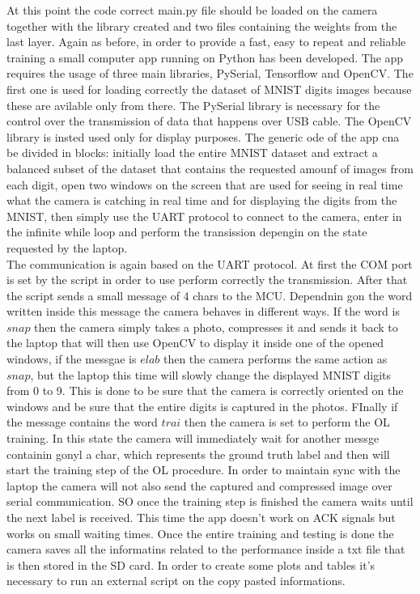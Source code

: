 \documentclass[12pt]{report}
\begin{document}
At this point the code correct main.py file should be loaded on the camera together with the library created and two files containing the weights from the last layer. Again as before, in order to provide a fast, easy to repeat and reliable training a small computer app running on Python has been developed. The app requires the usage of three main libraries, PySerial, Tensorflow and OpenCV. The first one is used for loading correctly the dataset of MNIST digits images because these are avilable only from there. The PySerial library is necessary for the control over the transmission of data that happens over USB cable. The OpenCV library is insted used only for display purposes. The generic ode of the app cna be divided in blocks: initially load the entire MNIST dataset and extract a balanced subset of the dataset that contains the requested amounf of images from each digit, open two windows on the screen that are used for seeing in real time what the camera is catching in real time and for displaying the digits from the MNIST, then simply use the UART protocol to connect to the camera, enter in the infinite while loop and perform the transission depengin on the state requested by the laptop. \\
The communication is again based on the UART protocol. At first the COM port is set by the script in order to use perform correctly the transmission. After that the script sends a small message of 4 chars to the MCU. Dependnin gon the word written inside this message the camera behaves in different ways. If the word is $snap$ then the camera simply takes a photo, compresses it and sends it back to the laptop that will then use OpenCV to display it inside one of the opened windows, if the messgae is $elab$ then the camera performs the same action as $snap$, but the laptop this time will slowly change the displayed MNIST digits from 0 to 9. This is done to be sure that the camera is correctly oriented on the windows and be sure that the entire digits is captured in the photos. FInally if the message contains the word $trai$ then the camera is set to perform the OL training. In this state the camera will immediately wait for another messge containin gonyl a char, which represents the ground truth label and then will start the training step of the OL procedure. In order to maintain sync with the laptop the camera will not also send the captured and compressed image over serial communication. SO once the training step is finished the camera waits until the next label is received. This time the app doesn't work on ACK signals but works on small waiting times. Once the entire training and testing is done the camera saves all the informatins related to the performance inside a txt file that is then stored in the SD card. In order to create some plots and tables it's necessary to run an external script on the copy pasted informations. 
\end{document}
